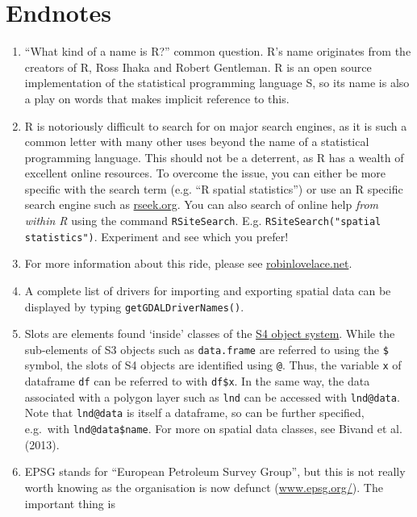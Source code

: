 \documentclass[]{article}
\begin{document}
\section{Endnotes}

\begin{enumerate}[1.]
\item
  ``What kind of a name is R?'' common question. R's name originates
  from the creators of R, Ross Ihaka and Robert Gentleman. R is an open
  source implementation of the statistical programming language S, so
  its name is also a play on words that makes implicit reference to
  this.
\item
  R is notoriously difficult to search for on major search engines, as
  it is such a common letter with many other uses beyond the name of a
  statistical programming language. This should not be a deterrent, as R
  has a wealth of excellent online resources. To overcome the issue, you
  can either be more specific with the search term (e.g. ``R spatial
  statistics'') or use an R specific search engine such as
  \href{http://www.rseek.org/}{rseek.org}. You can also search of online
  help \emph{from within R} using the command \texttt{RSiteSearch}. E.g.
  \texttt{RSiteSearch("spatial statistics")}. Experiment and see which
  you prefer!
\item
  For more information about this ride, please see
  \href{http://robinlovelace.net/ecotech/2013/10/13/bicycle-trailer-move.html}{robinlovelace.net}.
\item
  A complete list of drivers for importing and exporting spatial data
  can be displayed by typing \texttt{getGDALDriverNames()}.
\item
  Slots are elements found `inside' classes of the
  \href{http://adv-r.had.co.nz/S4.html}{S4 object system}. While the
  sub-elements of S3 objects such as \texttt{data.frame} are referred to
  using the \texttt{\$} symbol, the slots of S4 objects are identified
  using \texttt{@}. Thus, the variable \texttt{x} of dataframe
  \texttt{df} can be referred to with \texttt{df\$x}. In the same way,
  the data associated with a polygon layer such as \texttt{lnd} can be
  accessed with \texttt{lnd@data}. Note that \texttt{lnd@data} is itself
  a dataframe, so can be further specified, e.g.~with
  \texttt{lnd@data\$name}. For more on spatial data classes, see Bivand
  et al. (2013).
\item
  EPSG stands for ``European Petroleum Survey Group'', but this is not
  really worth knowing as the organisation is now defunct
  (\href{http://www.epsg.org/}{www.epsg.org/}). The important thing is

\end{enumerate}
\end{document}
